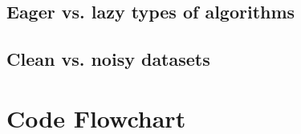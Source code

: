 \documentclass[a4paper]{article}
\begin{document}
\subsection{Eager vs. lazy types of algorithms}



\subsection{Clean vs. noisy datasets}


\clearpage


\section{Code Flowchart}

\clearpage

\end{document}

